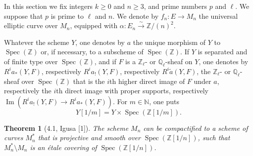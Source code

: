 \documentclass[10pt]{article}
\newcommand{\Q}{\mathbb Q}
\newcommand{\Z}{\mathbb Z}
\newcommand{\Spec}{\operatorname{Spec}}
\newcommand{\Imop}{\operatorname{Im}}
\newtheorem*{theorem}{Theorem}
\begin{document}
In this section we fix integers $k\geq 0$ and $n\geq 3$, and prime numbers $p$ and $\ell$. We suppose that $p$ is prime to $\ell$ and $n$. We denote by $f_n:E\to M_n$ the universal elliptic curve over $M_n$, equipped with $\alpha:E_n\xrightarrow{\sim}\Z/(n)^2$.

Whatever the scheme $Y$, one denotes by $a$ the unique morphism of $Y$ to $\Spec(\Z)$ or, if necessary, to a subscheme of $\Spec(\Z)$. If $Y$ is separated and of finite type over $\Spec(\Z)$, and if $F$ is a $\Z_\ell$- or $\Q_\ell$-sheaf on $Y$, one denotes by $R^ia_*(Y,F)$, respectively $R^ia_!(Y,F)$, respectively $R^i\widetilde a(Y,F)$, the $\Z_\ell$- or $\Q_\ell$-sheaf over $\Spec(\Z)$ that is the $i$th higher direct image of $F$ under $a$, respectively the $i$th direct image with proper supports, respectively $\Imop(R^ia_!(Y,F)\to R^ia_*(Y,F))$. For $m\in\mathbb N$, one puts
\[
Y[1/m]=Y\times\Spec(\Z[1/m]).
\]

\begin{theorem}[4.1, Igusa {\rm [1]}]
The scheme $M_n$ can be compactified to a scheme of curves $M_n^*$ that is projective and smooth over $\Spec(\Z[1/n])$, such that $M_n^*\setminus M_n$ is an étale covering of $\Spec(\Z[1/n])$.
\end{theorem}
\end{document}
